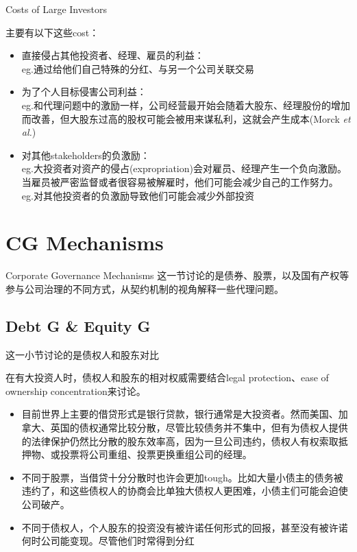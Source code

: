 \begin{frame}{Costs of Large Investors}
	
	主要有以下这些cost：
	\begin{itemize}
		\item 直接侵占其他投资者、经理、雇员的利益：\\
		eg.通过给他们自己特殊的分红、与另一个公司关联交易
		\item 为了个人目标侵害公司利益：\\
		eg.和代理问题中的激励一样，公司经营最开始会随着大股东、经理股份的增加而改善，但大股东过高的股权可能会被用来谋私利，这就会产生成本(Morck \textit{et al.})
		\item 对其他stakeholders的负激励：\\
		eg.大投资者对资产的侵占(expropriation)会对雇员、经理产生一个负向激励。当雇员被严密监督或者很容易被解雇时，他们可能会减少自己的工作努力。\\
		eg.对其他投资者的负激励导致他们可能会减少外部投资
		\end{itemize}
\end{frame}


\section{CG Mechanisms}
	\begin{frame}{Corporate Governance Mechanisms}
	这一节讨论的是债券、股票，以及国有产权等参与公司治理的不同方式，从契约机制的视角解释一些代理问题。

\end{frame}

\subsection{Debt G \& Equity G}
	\begin{frame}{}
	这一小节讨论的是债权人和股东对比\par
	在有大投资人时，债权人和股东的相对权威需要结合legal protection、ease of ownership concentration来讨论。
		\begin{itemize}
		\item 目前世界上主要的借贷形式是银行贷款，银行通常是大投资者。然而美国、加拿大、英国的债权通常比较分散，尽管比较债务并不集中，但有为债权人提供的法律保护仍然比分散的股东效率高，因为一旦公司违约，债权人有权索取抵押物、或投票将公司重组、投票更换重组公司的经理。
		\item 不同于股票，当借贷十分分散时也许会更加tough。比如大量小债主的债务被违约了，和这些债权人的协商会比单独大债权人更困难，小债主们可能会迫使公司破产。
		\item 不同于债权人，个人股东的投资没有被许诺任何形式的回报，甚至没有被许诺何时公司能变现。尽管他们时常得到分红
	\end{itemize}
\end{frame}

